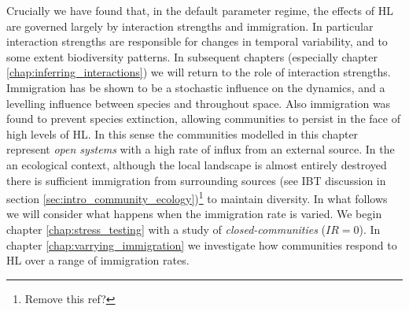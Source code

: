 Crucially we have found that, in the default parameter regime, the effects of HL are governed largely by interaction strengths and immigration. In particular interaction strengths are responsible for changes in temporal variability, and to some extent biodiversity patterns. In subsequent chapters (especially chapter \ref{chap:inferring_interactions}) we will return to the role of interaction strengths. Immigration has be shown to be a stochastic influence on the dynamics, and a levelling influence between species and throughout space. Also immigration was found to prevent species extinction, allowing communities to persist in the face of high levels of HL. In this sense the communities modelled in this chapter represent \emph{open systems} with a high rate of influx from an external source. In the an ecological context, although the local landscape is almost entirely destroyed there is sufficient immigration from surrounding sources (see IBT discussion in section \ref{sec:intro_community_ecology})\footnote{Remove this ref?} to maintain diversity. In what follows we will consider what happens when the immigration rate is varied. We begin chapter \ref{chap:stress_testing} with a study of \emph{closed-communities} ($IR=0$). In chapter \ref{chap:varrying_immigration} we investigate how communities respond to HL over a range of immigration rates. 
   




%	
%	
%	
%	
%	
%	

